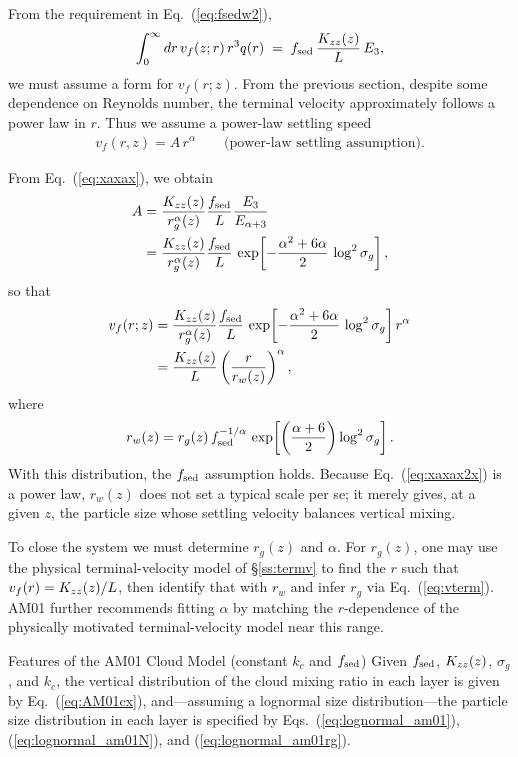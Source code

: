 From the requirement in Eq.~(\ref{eq:fsedw2}),
\begin{align}
\label{eq:xaxax}
 \int_0^\infty dr \, v_f(z;r)\, r^3 q(r) \;=\; f_\mathrm{sed}\, \frac{K_{zz}(z)}{L}\, E_3,
\end{align}
we must assume a form for $v_f(r; z)$.  
From the previous section, despite some dependence on Reynolds number, the terminal velocity approximately follows a power law in $r$.  
Thus we assume a power-law settling speed
\begin{align}
v_f(r,z) = A\, r^\alpha \qquad\text{(power-law settling assumption)}.
\end{align}

From Eq.~(\ref{eq:xaxax}), we obtain
\begin{align}
\label{eq:xaxax2}
 A &= \frac{K_{zz}(z)}{r_g^\alpha(z)} \frac{f_\mathrm{sed}}{L} \frac{E_3}{E_{\alpha+3}} \nonumber \\
 &= \frac{K_{zz}(z)}{r_g^\alpha(z)} \frac{f_\mathrm{sed}}{L}\, 
 \exp\!\left[ -\frac{\alpha^2 + 6 \alpha}{2}\, \log^2{\sigma_g} \right],
\end{align}
so that
\begin{align}
\label{eq:xaxax2x}
 v_f(r;z) &= \frac{K_{zz}(z)}{r_g^\alpha(z)} \frac{f_\mathrm{sed}}{L}\,
 \exp\!\left[ -\frac{\alpha^2 + 6 \alpha}{2}\, \log^2{\sigma_g} \right] r^\alpha \\
  &= \frac{K_{zz}(z)}{L} \left( \frac{r}{r_w(z)} \right)^\alpha,
\end{align}
where
\begin{align}
\label{eq:lognormal_am01rg}
r_w(z) = r_g(z)\, f_\mathrm{sed}^{-1/\alpha}\, \exp\!\left[ \left(\frac{\alpha+6}{2} \right) \log^2{\sigma_g}\right].
\end{align}
With this distribution, the $f_\mathrm{sed}$ assumption holds.  
Because Eq.~(\ref{eq:xaxax2x}) is a power law, $r_w(z)$ does not set a typical scale per se; it merely gives, at a given $z$, the particle size whose settling velocity balances vertical mixing.

To close the system we must determine $r_g(z)$ and $\alpha$.  
For $r_g(z)$, one may use the physical terminal-velocity model of §\ref{ss:termv} to find the $r$ such that $v_f(r)=K_{zz}(z)/L$, then identify that with $r_w$ and infer $r_g$ via Eq.~(\ref{eq:vterm}).  
AM01 further recommends fitting $\alpha$ by matching the $r$-dependence of the physically motivated terminal-velocity model near this range.

\begin{itembox}{Features of the AM01 Cloud Model (constant $k_c$ and $f_\mathrm{sed}$)}
Given $f_\mathrm{sed}$, $K_{zz}(z)$, $\sigma_g$, and $k_c$, the vertical distribution of the cloud mixing ratio in each layer is given by Eq.~(\ref{eq:AM01cx}), and—assuming a lognormal size distribution—the particle size distribution in each layer is specified by Eqs.~(\ref{eq:lognormal_am01}), (\ref{eq:lognormal_am01N}), and (\ref{eq:lognormal_am01rg}).
\end{itembox}

